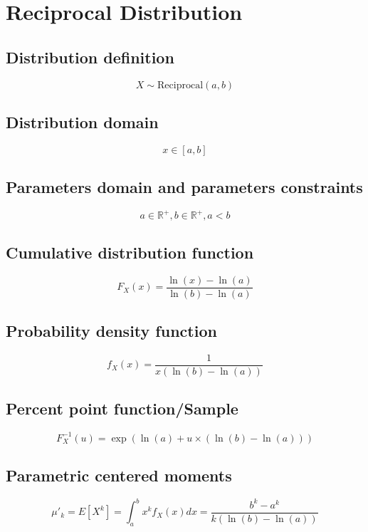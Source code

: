 \documentclass{article}
\begin{document}
\newpage
\section{Reciprocal Distribution}
\subsection{Distribution definition}
\begin{equation*} X\sim\mathrm{Reciprocal}\left(a,b\right) \end{equation*}
\subsection{Distribution domain}
\begin{equation*} x\in\left[a,b\right] \end{equation*}
\subsection{Parameters domain and parameters constraints}
\begin{equation*} a\in\mathbb{R}^{+}, b\in\mathbb{R}^{+}, a < b \end{equation*}
\subsection{Cumulative distribution function}
\begin{equation*} F_{X}\left(x\right)=\frac{\ln(x)-\ln(a)}{\ln(b)-\ln(a)} \end{equation*}
\subsection{Probability density function}
\begin{equation*} f_{X}\left(x\right)=\frac{1}{x\left(\ln(b)-\ln(a)\right)} \end{equation*}
\subsection{Percent point function/Sample}
\begin{equation*} F^{-1}_{X}\left(u\right)=\exp(\ln(a)+u\times \left(\ln(b)-\ln(a)\right)) \end{equation*}
\subsection{Parametric centered moments}
\begin{equation*} \mu'_{k}=E[X^k]=\int_{a }^{b}x^{k}f_{X}\left(x\right)dx=\frac{b^k-a^k}{k\left(\ln(b)-\ln(a)\right)} \end{equation*}
\end{document}
